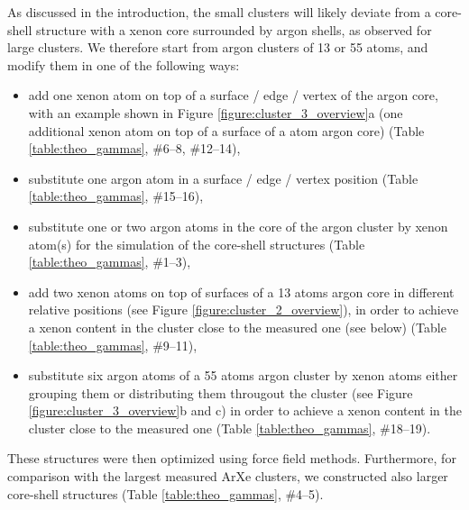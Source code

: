 As discussed in the introduction, the small clusters will likely
deviate from a core-shell structure with a xenon core surrounded
by argon shells, as observed for large clusters.\cite{tchaplyguinearxe,Vach_1999} We therefore start from
argon clusters of 13 or 55 atoms, and modify them in one of the following
ways:
%
\begin{itemize}
 \item add one xenon atom on top of a surface / edge / vertex of
       the argon core, with an example shown in
       Figure \ref{figure:cluster_3_overview}a
       (one additional xenon atom
       on top of a surface of a \unit[55]{atom} argon core)
       (Table \ref{table:theo_gammas}, \#6--8, \#12--14),
 \item substitute one argon atom in a surface / edge / vertex position
       (Table \ref{table:theo_gammas}, \#15--16),
 \item substitute one or two argon atoms in the core of the argon cluster
       by xenon atom(s) for the simulation of the core-shell structures
       (Table \ref{table:theo_gammas}, \#1--3),
 \item add two xenon atoms on top of surfaces of a 13 atoms argon core
       in different relative positions (see Figure
       \ref{figure:cluster_2_overview}),
       in order to achieve a xenon content in the cluster close to the
       measured one (see below)
       (Table \ref{table:theo_gammas}, \#9--11),
 \item substitute six argon atoms of a 55 atoms argon cluster by xenon
       atoms either grouping them or distributing them througout the cluster
       (see Figure \ref{figure:cluster_3_overview}b and c) in order to
       achieve a xenon content in the cluster close to the measured one
       (Table \ref{table:theo_gammas}, \#18--19).
\end{itemize}

These structures were then optimized using force field methods.
%
Furthermore, for comparison with the largest measured ArXe clusters, we constructed also larger core-shell structures (Table \ref{table:theo_gammas}, \#4--5).
